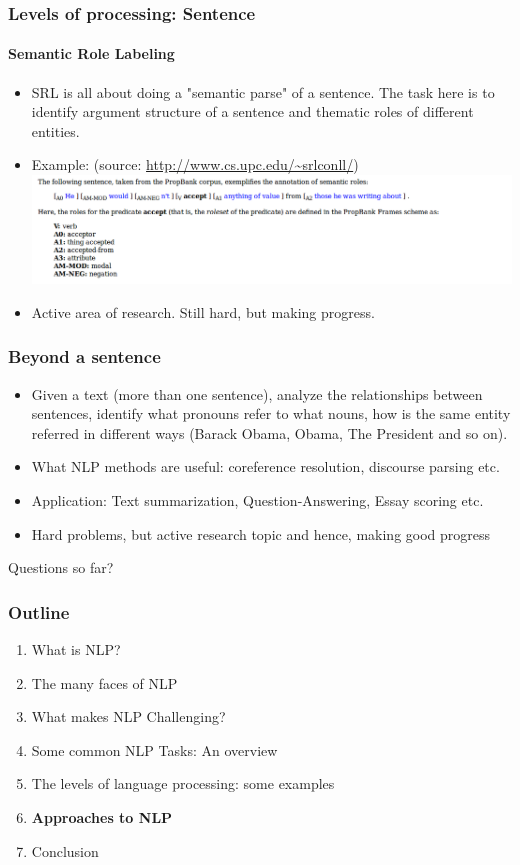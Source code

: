 \documentclass{beamer}
\begin{document}
\begin{frame}
\frametitle{Levels of processing: Sentence}
\framesubtitle{Semantic Role Labeling}
\begin{itemize}
\item SRL is all about doing a "semantic parse" of a sentence. The task here is to identify argument structure of a sentence and thematic roles of different entities.
\item Example: (source: \url{http://www.cs.upc.edu/~srlconll/})
\includegraphics[width=\textwidth]{figures/SRL.png}
\item Active area of research. Still hard, but making progress.
\end{itemize}
\end{frame}


\begin{frame}
\frametitle{Beyond a sentence}
\begin{itemize}
\item Given a text (more than one sentence), analyze the relationships between sentences, identify what pronouns refer to what nouns, how is the same entity referred in different ways (Barack Obama, Obama, The President and so on).
\item What NLP methods are useful: coreference resolution, discourse parsing etc. 
\item Application: Text summarization, Question-Answering, Essay scoring etc.
\item Hard problems, but active research topic and hence, making good progress
\end{itemize}
\end{frame}

\begin{frame}
\Large Questions so far?
\end{frame}

\begin{frame}
\frametitle{Outline}
\begin{enumerate}
    \item What is NLP?
    \item The many faces of NLP
    \item What makes NLP Challenging?
    \item Some common NLP Tasks: An overview
    \item The levels of language processing: some examples
    \item \textbf{Approaches to NLP}
    \item Conclusion
\end{enumerate}
\end{frame}
\end{document}
